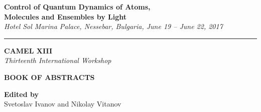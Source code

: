 \thispagestyle{empty}



\begin{center}

{\LARGE \textsf{\textbf{Control of Quantum Dynamics of Atoms,}\\ \vspace{2mm} \textbf{Molecules and Ensembles by Light} }}\\ \vspace{2mm}
\begingroup
    \fontsize{15pt}{12pt}\selectfont
    \emph{Hotel Sol Marina Palace, Nessebar, Bulgaria, June 19 -- June 22, 2017}
\endgroup

\vspace{3mm}

\hrule

\vspace{25mm}

{\fontsize{40}{48}\selectfont \textsf{\textbf{CAMEL XIII}}}\\
\vspace{5mm}
{\LARGE \emph{Thirteenth International Workshop}}\\

\vspace{30mm}

{\fontsize{36}{40}\selectfont \textsf{\textbf{BOOK OF  ABSTRACTS}}}\\

\vspace{20mm}

\Large{\textbf{Edited by} \\ Svetoslav Ivanov and Nikolay Vitanov}

\vspace{60mm}







\end{center}

